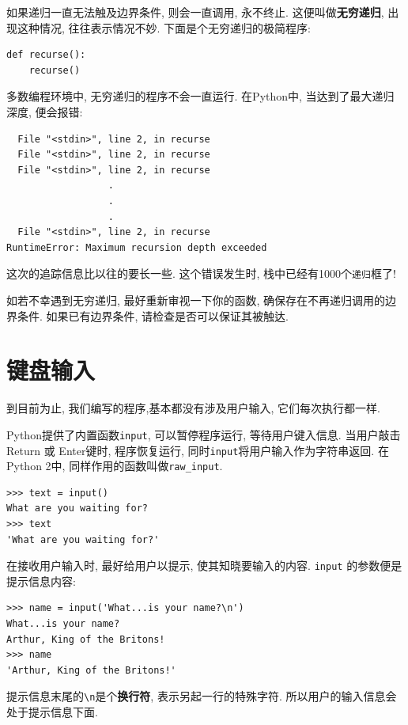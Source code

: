 \documentclass[10pt]{book}
\begin{document}
如果递归一直无法触及边界条件, 则会一直调用, 永不终止. 
这便叫做{\bf 无穷递归}, 出现这种情况, 往往表示情况不妙. 
下面是个无穷递归的极简程序:

\begin{verbatim}
def recurse():
    recurse()
\end{verbatim}
%
多数编程环境中, 无穷递归的程序不会一直运行. 
在Python中, 当达到了最大递归深度, 便会报错:

\begin{verbatim}
  File "<stdin>", line 2, in recurse
  File "<stdin>", line 2, in recurse
  File "<stdin>", line 2, in recurse
                  .   
                  .
                  .
  File "<stdin>", line 2, in recurse
RuntimeError: Maximum recursion depth exceeded
\end{verbatim}
%
这次的追踪信息比以往的要长一些. 这个错误发生时, 栈中已经有1000个{\tt 递归}框了!

如若不幸遇到无穷递归, 最好重新审视一下你的函数, 确保存在不再递归调用的边界条件. 
如果已有边界条件, 请检查是否可以保证其被触达. 


\section{键盘输入}

到目前为止, 我们编写的程序,基本都没有涉及用户输入, 它们每次执行都一样. 

Python提供了内置函数{\tt input},  可以暂停程序运行, 等待用户键入信息. 
当用户敲击{\sf  Return} 或 {\sf Enter}键时, 程序恢复运行, 
同时\verb"input"将用户输入作为字符串返回. 
在Python 2中, 同样作用的函数叫做\verb"raw_input".

\begin{verbatim}
>>> text = input()
What are you waiting for?
>>> text
'What are you waiting for?'
\end{verbatim}
%
在接收用户输入时, 最好给用户以提示, 使其知晓要输入的内容. 
 \verb"input" 的参数便是提示信息内容:

\begin{verbatim}
>>> name = input('What...is your name?\n')
What...is your name?
Arthur, King of the Britons!
>>> name
'Arthur, King of the Britons!'
\end{verbatim}
%
提示信息末尾的\verb"\n"是个{\bf 换行符},  表示另起一行的特殊字符. 
所以用户的输入信息会处于提示信息下面.  
\end{document}
